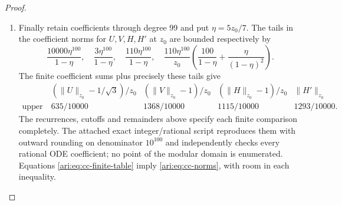 \begin{proof}
\begin{enumerate}[label=\arabic*.,leftmargin=*]
\item Finally retain coefficients through degree 99 and put
$\eta=5z_0/7$. The tails in the coefficient norms for
$U,V,H,H'$ at $z_0$ are bounded respectively by
\begin{equation}\label{ari:eq:cc-tail100}
 \frac{10000\eta^{100}}{1-\eta},\quad
 \frac{3\eta^{100}}{1-\eta},\quad
 \frac{110\eta^{100}}{1-\eta},\quad
 \frac{110\eta^{100}}{z_0}
 \left(\frac{100}{1-\eta}+\frac{\eta}{(1-\eta)^2}\right).
\end{equation}
The finite coefficient sums plus precisely these tails give
\begin{equation}\label{ari:eq:cc-finite-table}
 \begin{array}{c|cccc}
 & (\|U\|_{z_0}-1/\sqrt3)/z_0
 & (\|V\|_{z_0}-1)/z_0
 & (\|H\|_{z_0}-1)/z_0 & \|H'\|_{z_0}\\ \hline
 \text{upper bound}&635/10000&1368/10000&1115/10000&1293/10000.
 \end{array}
\end{equation}
The recurrences, cutoffs and remainders above specify each finite
comparison completely. The attached exact integer/rational
script reproduces them with outward rounding on denominator
$10^{100}$ and independently checks every rational ODE
coefficient; no point of the modular domain is enumerated.
Equations \eqref{ari:eq:cc-finite-table} imply
\eqref{ari:eq:cc-norms}, with room in each inequality.


\end{enumerate}
\end{proof}
